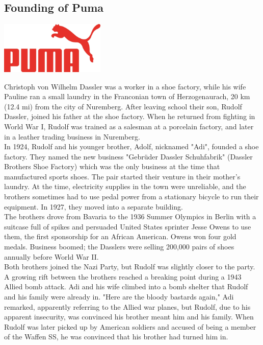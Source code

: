 \documentclass[11pt]{report}
\begin{document}
\subsection{Founding of Puma}
\vspace{2mm}\begin{center}\includegraphics[width=5cm]{./img/pumaLogo.jpg}\end{center}
Christoph von Wilhelm Dassler was a worker in a shoe factory, while his wife Pauline ran a small laundry in the Franconian town of Herzogenaurach, 20 km (12.4 mi) from the city of Nuremberg. After leaving school their son, Rudolf Dassler, joined his father at the shoe factory. When he returned from fighting in World War I, Rudolf was trained as a salesman at a porcelain factory, and later in a leather trading business in Nuremberg.\\
\indent In 1924, Rudolf and his younger brother, Adolf, nicknamed "Adi", founded a shoe factory. They named the new business "Gebrüder Dassler Schuhfabrik" (Dassler Brothers Shoe Factory) which was the only business at the time that manufactured sports shoes. The pair started their venture in their mother's laundry. At the time, electricity supplies in the town were unreliable, and the brothers sometimes had to use pedal power from a stationary bicycle to run their equipment. In 1927, they moved into a separate building.\\
\indent The brothers drove from Bavaria to the 1936 Summer Olympics in Berlin with a suitcase full of spikes and persuaded United States sprinter Jesse Owens to use them, the first sponsorship for an African American. Owens won four gold medals. Business boomed; the Dasslers were selling 200,000 pairs of shoes annually before World War II.\\
\indent Both brothers joined the Nazi Party, but Rudolf was slightly closer to the party. A growing rift between the brothers reached a breaking point during a 1943 Allied bomb attack. Adi and his wife climbed into a bomb shelter that Rudolf and his family were already in. "Here are the bloody bastards again," Adi remarked, apparently referring to the Allied war planes, but Rudolf, due to his apparent insecurity, was convinced his brother meant him and his family. When Rudolf was later picked up by American soldiers and accused of being a member of the Waffen SS, he was convinced that his brother had turned him in.
\end{document}
